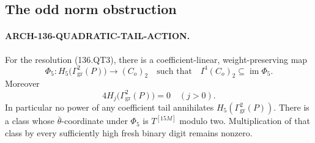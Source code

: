 \subsection{The odd norm obstruction}

\paragraph{ARCH-136-QUADRATIC-TAIL-ACTION.}
For the resolution (136.QT3), there is a coefficient-linear,
weight-preserving map
\[
 \Phi_5:H_5\bigl(\Gamma^2_{\mathrm{gr}}(P)\bigr)
                                  \longrightarrow(C_o)_2
 \quad\text{such that}\quad
                 I^4(C_o)_2\subseteq\operatorname{im}\Phi_5.
                                                               \tag{136.QT7}
\]
Moreover
\[
              4H_j\bigl(\Gamma^2_{\mathrm{gr}}(P)\bigr)=0
                                                   \quad(j>0).
                                                               \tag{136.QT8}
\]
In particular no power of any coefficient tail annihilates
\(H_5(\Gamma^2_{\mathrm{gr}}(P))\).  There is a class whose
\(\bar\theta\)-coordinate under \(\Phi_5\) is
\(T^{[15M]}\) modulo two.  Multiplication of that class by
every sufficiently high fresh binary digit remains nonzero.

